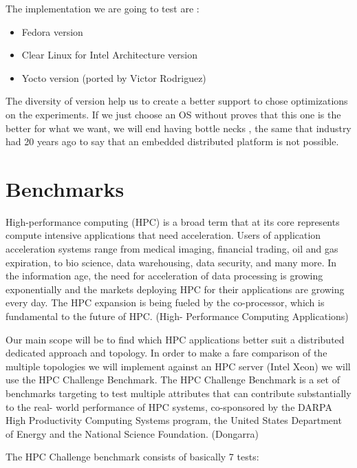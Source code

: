 The implementation we are going to test are : 

\begin{itemize}
    \item Fedora version
    \item Clear Linux for Intel Architecture version
    \item Yocto version (ported by Victor Rodriguez)
\end{itemize}

The diversity of version help us to create a better support to chose
optimizations on the experiments. If we just choose an OS without proves that
this one is the better for what we want, we will end having bottle necks , the
same that industry had 20 years ago to say that an embedded distributed
platform is not possible.

\section{Benchmarks}
\noindent

High-performance computing (HPC) is a broad term that at its core represents
compute intensive applications that need acceleration. Users of application
acceleration systems range from medical imaging, financial trading, oil and gas
expiration, to bio science, data warehousing, data security, and many more. In
the information age, the need for acceleration of data processing is growing
exponentially and the markets deploying HPC for their applications are growing
every day. The HPC expansion is being fueled by the co-processor, which is
fundamental to the future of HPC. (High- Performance Computing Applications)

Our main scope will be to find which HPC applications better suit a distributed
dedicated approach and topology.
In order to make a fare comparison of the multiple topologies we will implement
against an HPC server (Intel Xeon) we will use the HPC Challenge Benchmark. The
HPC Challenge Benchmark is a set of benchmarks targeting to test multiple
attributes that can contribute substantially to the real- world performance of
HPC systems, co-sponsored by the DARPA High Productivity Computing Systems
program, the United States Department of Energy and the National Science
Foundation. (Dongarra)

The HPC Challenge benchmark consists of basically 7 tests:


